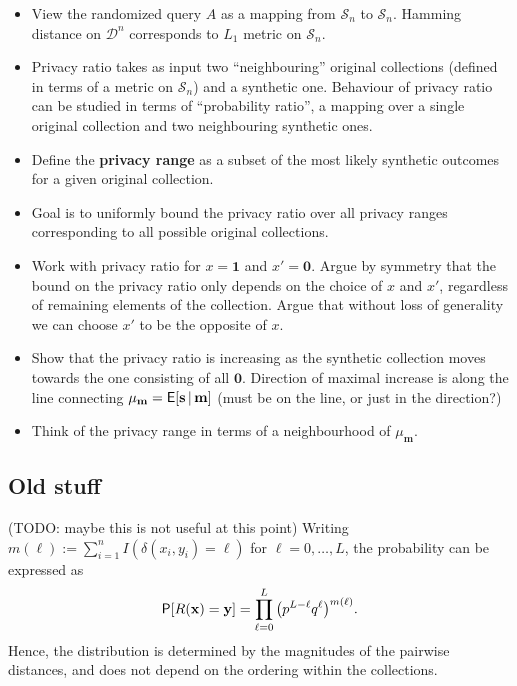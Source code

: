 \documentclass[11pt,draft]{article}
\newcommand{\Dsp}{\mathcal{D}}
\newcommand{\Ssp}{\mathcal{S}}
\newcommand{\xv}{\mathbf{x}}
\newcommand{\yv}{\mathbf{y}}
\newcommand{\sv}{\mathbf{s}}
\newcommand{\mv}{\mathbf{m}}
\newcommand{\one}{\boldsymbol{1}}
\newcommand{\zero}{\boldsymbol{0}}
\begin{document}
\begin{itemize}
\item
View the randomized query $A$ as a mapping from $\Ssp_n$ to $\Ssp_n$.
Hamming distance on $\Dsp^n$ corresponds to $L_1$ metric on $\Ssp_n$.

\item
Privacy ratio takes as input two ``neighbouring'' original collections (defined
in terms of a metric on $\Ssp_n$) and a synthetic one. Behaviour of privacy
ratio can be studied in terms of ``probability ratio'', a mapping over a single
original collection and two neighbouring synthetic ones.

\item
Define the \textbf{privacy range} as a subset of the most likely synthetic
outcomes for a given original collection.

\item
Goal is to uniformly bound the privacy ratio over all privacy ranges
corresponding to all possible original collections.

\item
Work with privacy ratio for $x = \one$ and $x' = \zero$. Argue by symmetry that
the bound on the privacy ratio only depends on the choice of $x$ and $x'$,
regardless of remaining elements of the collection.
Argue that without loss of generality we can choose $x'$ to be the opposite of
$x$.

\item
Show that the privacy ratio is increasing as the synthetic collection moves
towards the one consisting of all $\zero$.
Direction of maximal increase is along the line connecting $\mu_{\mv} =
\EP[\sv\given\mv]$ (must be on the line, or just in the direction?)

\item
Think of the privacy range in terms of a neighbourhood of $\mu_{\mv}$.
\end{itemize}

\hrulefill

\subsection{Old stuff}


(TODO: maybe this is not useful at this point)
Writing $m(\ell) := \sum_{i=1}^n I(\delta(x_i, y_i) = \ell)$ for
$\ell = 0,\dots,L$, the probability can be expressed as
\[ \P[R(\xv) = \yv] = \prod_{\ell = 0}^L \big(p^{L-\ell}q^\ell\big)^{m(\ell)}.
\]
Hence, the distribution is determined by the magnitudes of the pairwise
distances, and does not depend on the ordering within the collections.
\end{document}
